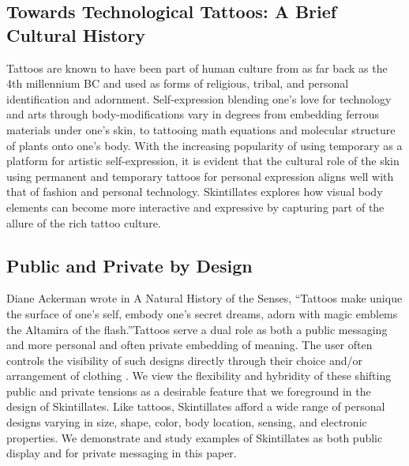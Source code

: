 \documentclass{sigchi}
\begin{document}
\subsection{Towards Technological Tattoos: A Brief Cultural History}

Tattoos are known to have been part of human culture from as far back as the 4th millennium BC and used as forms of religious, tribal, and personal identification and adornment\cite{Grognard:o1z3U5M2}. Self-expression blending one's love for technology and arts through body-modifications vary in degrees from embedding ferrous materials under one's skin\cite{Norton:OK5Z52w0}, to tattooing math equations and molecular structure of plants onto one's body\cite{Zimmer:2011wb}. With the increasing popularity of using temporary as a platform for artistic self-expression\cite{Fanning:v_9LfC8A,ByCourtneyRubin:tj}, it is evident that the cultural role of the skin using permanent and temporary tattoos for personal expression aligns well with that of fashion and personal technology.  Skintillates explores how visual body elements can become more interactive and expressive by capturing part of the allure of the rich tattoo culture. 

\subsection{Public and Private by Design}
Diane Ackerman wrote in A Natural History of the Senses, ``Tattoos make unique the surface of one's self, embody one's secret dreams, adorn with magic emblems the Altamira of the flash.''Tattoos serve a dual role as both a public messaging and more personal and often private embedding of meaning.  The user often controls the visibility of such designs directly through their choice and/or arrangement of clothing \cite{Doss:2009ee,McLeod:2014ua}. We view the flexibility and hybridity of these shifting public and private tensions as a desirable feature that we foreground in the design of Skintillates.   Like tattoos, Skintillates afford a wide range of personal designs varying in size, shape, color, body location, sensing, and electronic properties. We demonstrate and study examples of Skintillates as both public display and for private messaging in this paper. 
\end{document}
